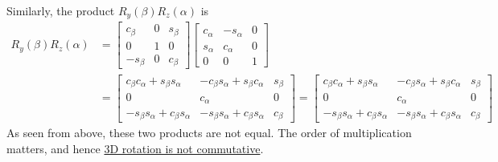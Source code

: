 Similarly, the product \( R_y(\beta)R_z(\alpha) \) is
\begin{align*}
    R_y(\beta)R_z(\alpha)
     & =
    \begin{bmatrix}
        c_{\beta}  & 0 & s_{\beta} \\
        0          & 1 & 0         \\
        -s_{\beta} & 0 & c_{\beta}
    \end{bmatrix}
    \begin{bmatrix}
        c_{\alpha} & -s_{\alpha} & 0 \\
        s_{\alpha} & c_{\alpha}  & 0 \\
        0          & 0           & 1
    \end{bmatrix}
    \\ & =
    \begin{bmatrix}
        c_{\beta}c_{\alpha} + s_{\beta}s_{\alpha}  & -c_{\beta}s_{\alpha} + s_{\beta}c_{\alpha} & s_{\beta} \\
        0                                          & c_{\alpha}                                 & 0         \\
        -s_{\beta}s_{\alpha} + c_{\beta}s_{\alpha} & -s_{\beta}s_{\alpha} + c_{\beta}s_{\alpha} & c_{\beta}
    \end{bmatrix}
    =
    \begin{bmatrix}
        c_{\beta}c_{\alpha} + s_{\beta}s_{\alpha}  & -c_{\beta}s_{\alpha} + s_{\beta}c_{\alpha} & s_{\beta} \\
        0                                          & c_{\alpha}                                 & 0         \\
        -s_{\beta}s_{\alpha} + c_{\beta}s_{\alpha} & -s_{\beta}s_{\alpha} + c_{\beta}s_{\alpha} & c_{\beta}
    \end{bmatrix}
\end{align*}
As seen from above, these two products are not equal.
The order of multiplication matters, and hence \underline{3D rotation is not commutative}.
